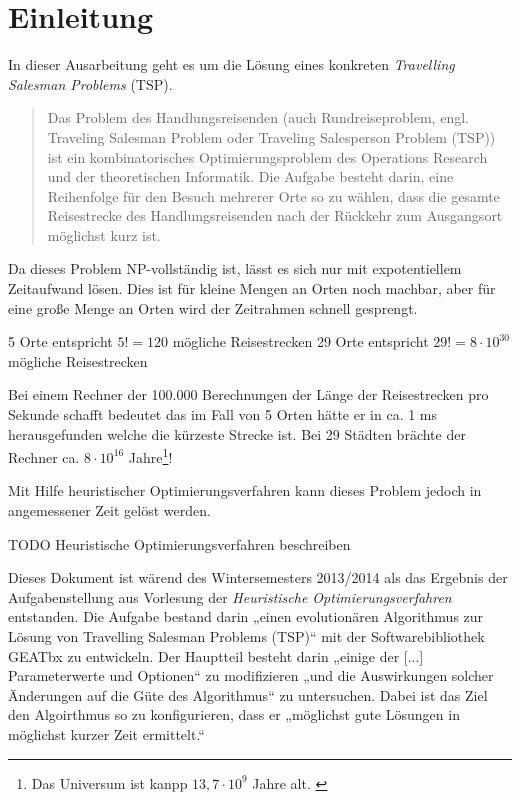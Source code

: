 \section{Einleitung}

In dieser Ausarbeitung geht es um die Lösung eines konkreten
\emph{Travelling Salesman Problems} (TSP).

\begin{quote}
Das Problem des Handlungsreisenden (auch Rundreiseproblem, engl. Traveling Salesman Problem oder Traveling Salesperson Problem (TSP)) ist ein kombinatorisches Optimierungsproblem des Operations Research und der theoretischen Informatik. Die Aufgabe besteht darin, eine Reihenfolge für den Besuch mehrerer Orte so zu wählen, dass die gesamte Reisestrecke des Handlungsreisenden nach der Rückkehr zum Ausgangsort möglichst kurz ist. \citep{wikiTsp}
\end{quote}

\noindent Da dieses Problem NP-vollständig ist, lässt es sich nur mit
expotentiellem Zeitaufwand lösen.
Dies ist für kleine Mengen an Orten noch machbar, aber für eine große
Menge an Orten wird der Zeitrahmen schnell gesprengt.

5 Orte entspricht $5! = 120$ mögliche Reisestrecken
29 Orte entspricht $29! = 8 \cdot 10^{30}$ mögliche Reisestrecken

Bei einem Rechner der 100.000 Berechnungen der Länge der Reisestrecken pro
Sekunde schafft bedeutet das im Fall von 5 Orten hätte er in ca. 1 ms
herausgefunden welche die kürzeste Strecke ist.
Bei 29 Städten brächte der Rechner ca. $8 \cdot 10^{16}$ Jahre\footnote{Das Universum ist
kanpp $13,7 \cdot 10^{9}$ Jahre alt. \citep[siehe][]{wikiUniversum}}!

Mit Hilfe heuristischer Optimierungsverfahren kann dieses Problem
jedoch in angemessener Zeit gelöst werden.

TODO Heuristische Optimierungsverfahren beschreiben


Dieses Dokument ist wärend des Wintersemesters 2013/2014 als das Ergebnis
der Aufgabenstellung aus Vorlesung der
\emph{Heuristische Optimierungsverfahren} entstanden.
Die Aufgabe bestand darin „einen evolutionären Algorithmus zur Lösung von
Travelling Salesman Problems (TSP)“ mit der Softwarebibliothek GEATbx zu entwickeln.
Der Hauptteil besteht darin „einige der [...] Parameterwerte und Optionen“ zu
modifizieren „und die Auswirkungen solcher Änderungen auf die Güte des Algorithmus“
zu untersuchen.
Dabei ist das Ziel den Algoirthmus so zu konfigurieren, dass er
„möglichst gute Lösungen in möglichst kurzer Zeit ermittelt.“ \citep[Aus][]{aufg}

